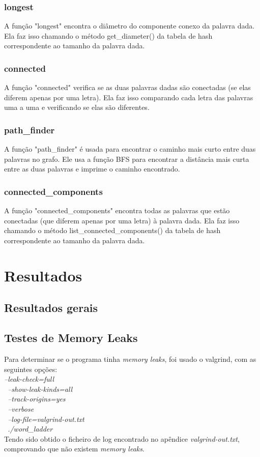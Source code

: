 \documentclass[a4paper,11pt]{article}
\begin{document}
    \subsubsection{longest}
    A função "longest" encontra o diâmetro do componente conexo da palavra dada. Ela faz isso chamando o método get\_diameter() da tabela de hash correspondente ao tamanho da palavra dada.
    
    \subsubsection{connected}
    A função "connected" verifica se as duas palavras dadas são conectadas (se elas diferem apenas por uma letra). Ela faz isso comparando cada letra das palavras uma a uma e verificando se elas são diferentes.
    
    \subsubsection{path\_finder}
    A função "path\_finder" é usada para encontrar o caminho mais curto entre duas palavras no grafo. Ele usa a função BFS para encontrar a distância mais curta entre as duas palavras e imprime o caminho encontrado.
    
    \subsubsection{connected\_components}
A função "connected\_components" encontra todas as palavras que estão conectadas (que diferem apenas por uma letra) à palavra dada. Ela faz isso chamando o método list\_connected\_components() da tabela de hash correspondente ao tamanho da palavra dada.
    
    \section{Resultados}\label{sec:resultados}

	\subsection{Resultados gerais}
	
	\subsection{Testes de Memory Leaks}
	Para determinar se o programa tinha \emph{memory leaks}, foi usado o valgrind, com as seguintes opções:\\
	\emph{--leak-check=full \\\
         --show-leak-kinds=all \\\
         --track-origins=yes \\\
         --verbose \\\
         --log-file=valgrind-out.txt \\\
         ./word\_ladder }\\
         Tendo sido obtido o ficheiro de log encontrado no apêndice \emph{valgrind-out.txt}, comprovando que não existem \emph{memory leaks}.
         \clearpage
	
\end{document}

